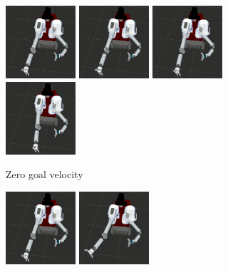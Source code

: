 \documentclass[letterpaper, 10 pt, conference]{ieeeconf}  %
\begin{document}
\begin{figure}[t!]
	\centering
	\begin{minipage}[t]{0.64\linewidth}
	\begin{subfigure}[b]{\textwidth}
		\centering
		\includegraphics[height=2.7cm]{fig/motivation/slow1}
		\includegraphics[height=2.7cm]{fig/motivation/slow2}
		\includegraphics[height=2.7cm]{fig/motivation/slow3}
		\includegraphics[height=2.7cm]{fig/motivation/slow4}
		\caption{Zero goal velocity}
		\label{fig:motivation:slow}
	\end{subfigure}
	\begin{subfigure}[b]{\textwidth}
		\centering
		\includegraphics[height=2.7cm]{fig/motivation/fast1}
		\includegraphics[height=2.7cm]{fig/motivation/fast2}

\end{subfigure}
\end{minipage}
\end{figure}
\end{document}
